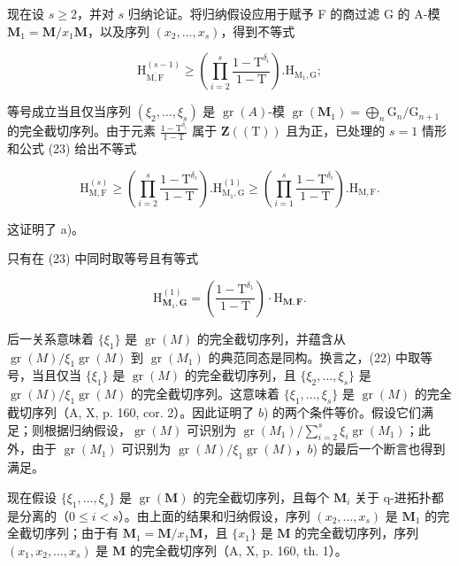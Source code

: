 现在设 \(s \geqslant 2\)，并对 \(s\) 归纳论证。将归纳假设应用于赋予 F 的商过滤 G 的 A-模 \(\mathbf{M}_{1} = \mathbf{M}/x_{1}\mathbf{M}\)，以及序列 \((x_{2}, ..., x_{s})\)，得到不等式

\[
\mathrm{H} _ {\overline {{\mathrm{M,F}}}} ^ {(s - 1)} \geqslant \left(\prod_ {i = 2} ^ {s} \frac {1 - \mathrm{T} ^ {\delta_ {i}}}{1 - \mathrm{T}}\right). \mathrm{H} _ {\mathrm{M} _ {1}, \mathrm{G}};\tag{23}
\]

等号成立当且仅当序列 \((\xi_{2}, \ldots, \xi_{s})\) 是 \(\operatorname{gr}(A)\)-模 \(\operatorname{gr}(\mathbf{M}_{1}) = \bigoplus_{n} \mathrm{G}_{n}/\mathrm{G}_{n+1}\) 的完全截切序列。由于元素 \(\frac{1 - \mathrm{T}^{\delta_{i}}}{1 - \mathrm{T}}\) 属于 \(\mathbf{Z}((\mathrm{T}))\) 且为正，已处理的 \(s = 1\) 情形和公式 (23) 给出不等式

\[
\mathrm{H} _ {\mathrm{M}, \mathrm{F}} ^ {(s)} \geqslant \left(\prod_ {i = 2} ^ {s} \frac {1 - \mathrm{T} ^ {\delta_ {i}}}{1 - \mathrm{T}}\right). \mathrm{H} _ {\mathrm{M} _ {1}, \mathrm{G}} ^ {(1)} \geqslant \left(\prod_ {i = 1} ^ {s} \frac {1 - \mathrm{T} ^ {\delta_ {i}}}{1 - \mathrm{T}}\right). \mathrm{H} _ {\mathrm{M}, \mathrm{F}}.\tag{24}
\]

这证明了 a)。

只有在 (23) 中同时取等号且有等式

\[
\mathrm{H} _ {\mathbf {M} _ {1}, \mathbf {G}} ^ {(1)} = \left(\frac {1 - \mathrm{T} ^ {\delta_ {1}}}{1 - \mathrm{T}}\right) \cdot \mathrm{H} _ {\mathbf {M}, \mathbf {F}}.\tag{25}
\]

后一关系意味着 \(\{\xi_{1}\}\) 是 \(\operatorname{gr}(M)\) 的完全截切序列，并蕴含从 \(\operatorname{gr}(M)/\xi_{1}\operatorname{gr}(M)\) 到 \(\operatorname{gr}(M_{1})\) 的典范同态是同构。换言之，(22) 中取等号，当且仅当 \(\{\xi_{1}\}\) 是 \(\operatorname{gr}(M)\) 的完全截切序列，且 \(\{\xi_{2}, ..., \xi_{s}\}\) 是 \(\operatorname{gr}(M)/\xi_{1}\operatorname{gr}(M)\) 的完全截切序列。这意味着 \(\{\xi_{1}, ..., \xi_{s}\}\) 是 \(\operatorname{gr}(M)\) 的完全截切序列（A, X, p. 160, cor. 2）。因此证明了 \(b\)) 的两个条件等价。假设它们满足；则根据归纳假设，\(\operatorname{gr}(M)\) 可识别为 \(\operatorname{gr}(M_{1})/\sum_{i=2}^{s} \xi_{i}\operatorname{gr}(M_{1})\)；此外，由于 \(\operatorname{gr}(M_{1})\) 可识别为 \(\operatorname{gr}(M)/\xi_{1}\operatorname{gr}(M)\)，\(b\)) 的最后一个断言也得到满足。

现在假设 \(\{\xi_1, \ldots, \xi_s\}\) 是 \(\operatorname{gr}(\mathbf{M})\) 的完全截切序列，且每个 \(\mathbf{M}_i\) 关于 q-进拓扑都是分离的（\(0 \leqslant i < s\)）。由上面的结果和归纳假设，序列 \((x_2, \ldots, x_s)\) 是 \(\mathbf{M}_1\) 的完全截切序列；由于有 \(\mathbf{M}_1 = \mathbf{M}/x_1\mathbf{M}\)，且 \(\{x_1\}\) 是 \(\mathbf{M}\) 的完全截切序列，序列 \((x_1, x_2, \ldots, x_s)\) 是 \(\mathbf{M}\) 的完全截切序列（A, X, p. 160, th. 1）。

